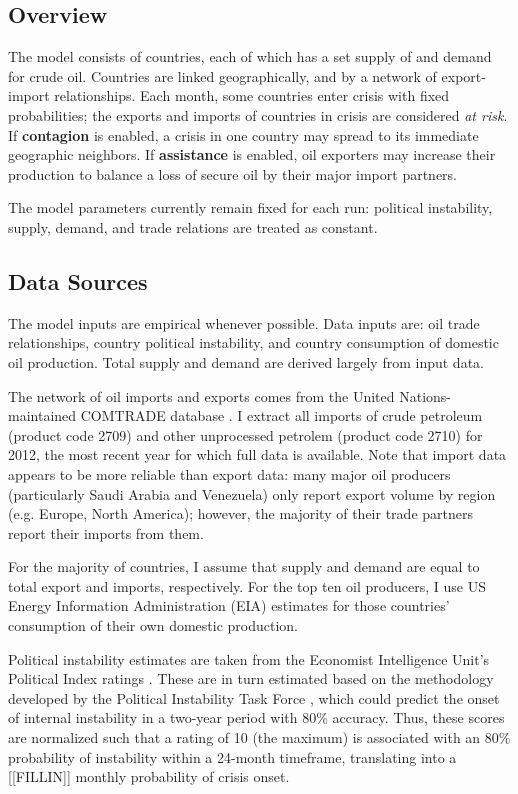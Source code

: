 \documentclass{article}
\begin{document}
\subsection{Overview}

The model consists of countries, each of which has a set supply of and demand for crude oil. Countries are linked geographically, and by a network of export-import relationships. Each month, some countries enter crisis with fixed probabilities; the exports and imports of countries in crisis are considered \emph{at risk}. If \textbf{contagion} is enabled, a crisis in one country may spread to its immediate geographic neighbors. If \textbf{assistance} is enabled, oil exporters may increase their production to balance a loss of secure oil by their major import partners.

The model parameters currently remain fixed for each run: political instability, supply, demand, and trade relations are treated as constant. 

\subsection{Data Sources}
The model inputs are empirical whenever possible. Data inputs are: oil trade relationships, country political instability, and country consumption of domestic oil production. Total supply and demand are derived largely from input data.

The network of oil imports and exports comes from the United Nations-maintained COMTRADE database \citep{un_2013}. I extract all imports of crude petroleum (product code 2709) and other unprocessed petrolem (product code 2710) for 2012, the most recent year for which full data is available. Note that import data appears to be more reliable than export data: many major oil producers (particularly Saudi Arabia and Venezuela) only report export volume by region (e.g. Europe, North America); however, the majority of their trade partners report their imports from them.

For the majority of countries, I assume that supply and demand are equal to total export and imports, respectively. For the top ten oil producers, I use US Energy Information Administration (EIA) estimates \citep{} for those countries' consumption of their own domestic production. 

Political instability estimates are taken from the Economist Intelligence Unit's Political Index ratings \citep{eiu_2013}. These are in turn estimated based on the methodology developed by the Political Instability Task Force \citep{goldstone_2005}, which could predict the onset of internal instability in a two-year period with 80\% accuracy. Thus, these scores are normalized such that a rating of 10 (the maximum) is associated with an 80\% probability of instability within a 24-month timeframe, translating into a [[FILLIN]] monthly probability of crisis onset.
\end{document}

